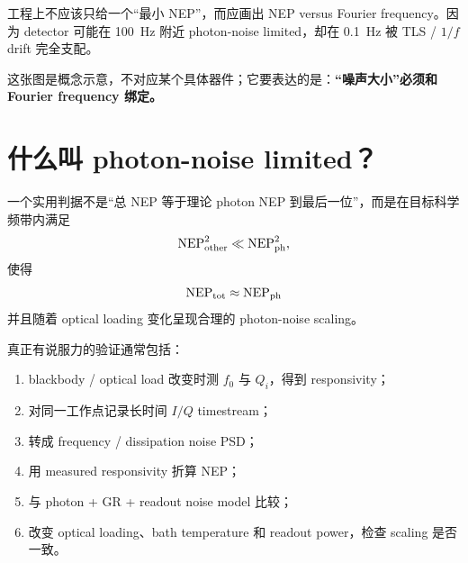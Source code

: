 \documentclass[11pt,a4paper,openany]{ctexrep}
\begin{document}
工程上不应该只给一个“最小 NEP”，而应画出 NEP versus Fourier frequency。因为 detector 可能在 \SI{100}{Hz} 附近 photon-noise limited，却在 \SI{0.1}{Hz} 被 TLS / $1/f$ drift 完全支配。

\begin{center}
\end{center}

这张图是概念示意，不对应某个具体器件；它要表达的是：\textbf{“噪声大小”必须和 Fourier frequency 绑定。}

\section{什么叫 photon-noise limited？}

一个实用判据不是“总 NEP 等于理论 photon NEP 到最后一位”，而是在目标科学频带内满足
\[
\mathrm{NEP}_{\rm other}^2
\ll
\mathrm{NEP}_{\rm ph}^2,
\]
使得
\[
\mathrm{NEP}_{\rm tot}
\approx
\mathrm{NEP}_{\rm ph}
\]
并且随着 optical loading 变化呈现合理的 photon-noise scaling。

真正有说服力的验证通常包括：
\begin{enumerate}
  \item blackbody / optical load 改变时测 $f_0$ 与 $Q_i$，得到 responsivity；
  \item 对同一工作点记录长时间 $I/Q$ timestream；
  \item 转成 frequency / dissipation noise PSD；
  \item 用 measured responsivity 折算 NEP；
  \item 与 photon + GR + readout noise model 比较；
  \item 改变 optical loading、bath temperature 和 readout power，检查 scaling 是否一致。
\end{enumerate}
\end{document}
